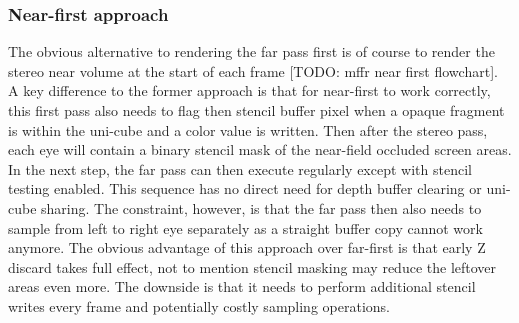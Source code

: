 \subsubsection{Near-first approach}
The obvious alternative to rendering the far pass first is of course to render the stereo near volume at the start of each frame [TODO: mffr near first flowchart]. A key difference to the former approach is that for near-first to work correctly, this first pass also needs to flag then stencil buffer pixel when a opaque fragment is within the uni-cube and a color value is written. Then after the stereo pass, each eye will contain a binary stencil mask of the near-field occluded screen areas. In the next step, the far pass can then execute regularly except with stencil testing enabled. This sequence has no direct need for depth buffer clearing or uni-cube sharing. The constraint, however, is that the far pass then also needs to sample from left to right eye separately as a straight buffer copy cannot work anymore. 
The obvious advantage of this approach over far-first is that early Z discard takes full effect, not to mention stencil masking may reduce the leftover areas even more. The downside is that it needs to perform additional stencil writes every frame and potentially costly sampling operations. 

